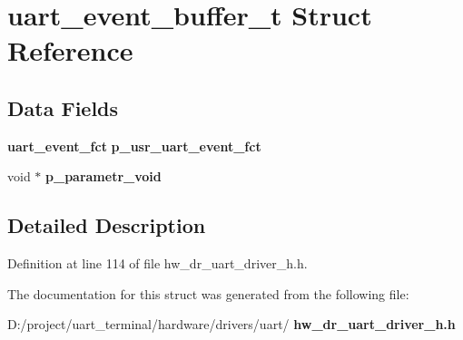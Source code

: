 \section{uart\+\_\+event\+\_\+buffer\+\_\+t Struct Reference}
\label{structuart__event__buffer__t}
\subsection*{Data Fields}
\begin{DoxyCompactItemize}
\item 
\mbox{\label{structuart__event__buffer__t_a2aa13eb22d30c3dd358d47444daf1800}} 
\textbf{ uart\+\_\+event\+\_\+fct} {\bfseries p\+\_\+usr\+\_\+uart\+\_\+event\+\_\+fct}
\item 
\mbox{\label{structuart__event__buffer__t_af752e0be0d8ca292d637313bada33817}} 
void $\ast$ {\bfseries p\+\_\+parametr\+\_\+void}
\end{DoxyCompactItemize}


\subsection{Detailed Description}


Definition at line 114 of file hw\+\_\+dr\+\_\+uart\+\_\+driver\+\_\+h.\+h.



The documentation for this struct was generated from the following file\+:\begin{DoxyCompactItemize}
\item 
D\+:/project/uart\+\_\+terminal/hardware/drivers/uart/\textbf{ hw\+\_\+dr\+\_\+uart\+\_\+driver\+\_\+h.\+h}\end{DoxyCompactItemize}
